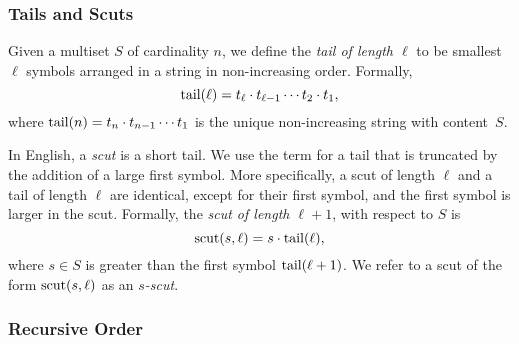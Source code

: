 \subsubsection{Tails and Scuts}
\label{sec:proof_scuts}

Given a multiset $S$ of cardinality $n$, we define the \emph{tail of length $\ell$} to be smallest $\ell$ symbols arranged in a string in non-increasing order.
Formally,
\begin{equation}
    \operatorname{tail}(\ell) = t_{\ell} \cdot t_{\ell-1} \cdots t_2 \cdot t_1,
\end{equation}
where $\operatorname{tail}(n) = t_n \cdot t_{n-1} \cdots t_1$ is the unique non-increasing string with content~$S$.

In English, a \emph{scut} is a short tail.
We use the term for a tail that is truncated by the addition of a large first symbol.
More specifically, a scut of length $\ell$ and a tail of length $\ell$ are identical, except for their first symbol, and the first symbol is larger in the scut. %
Formally, the \emph{scut of length $\ell+1$}, with respect to $S$ is
\begin{equation}
    \operatorname{scut}(s, \ell) = s \cdot \operatorname{tail}(\ell),
\end{equation}
where $s \in S$ is greater than the first symbol $\operatorname{tail}(\ell+1)$.
We refer to a scut of the form $\operatorname{scut}(s, \ell)$ as an \emph{$s$-scut}.

\subsubsection{Recursive Order}
\label{sec:proof_recursive}

